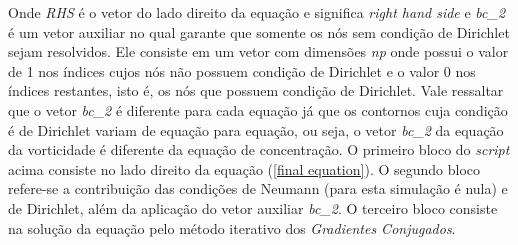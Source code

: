 \noindent
Onde \textit{RHS} é o vetor do lado direito da equação e significa
\textit{right hand side} e \textit{bc\_2} é um vetor auxiliar
no qual garante que somente os nós sem condição de Dirichlet sejam
resolvidos. Ele consiste em um vetor com dimensões \textit{np}
onde possui o valor de 1 nos índices cujos nós não possuem
condição de Dirichlet e o valor 0 nos índices restantes, isto é,
os nós que possuem condição de Dirichlet. Vale ressaltar que o
vetor \textit{bc\_2} é diferente para cada equação já que os
contornos cuja condição é de Dirichlet variam de equação para equação,
ou seja, o vetor \textit{bc\_2} da equação da vorticidade é
diferente da equação de concentração. O primeiro bloco do \textit{script}
acima consiste no lado direito da equação (\ref{final equation}).
O segundo bloco refere-se a contribuição das condições de Neumann
(para esta simulação é nula) e de Dirichlet, além da aplicação do vetor
auxiliar \textit{bc\_2}. O terceiro bloco consiste na solução da
equação pelo método iterativo dos \textit{Gradientes Conjugados}.

